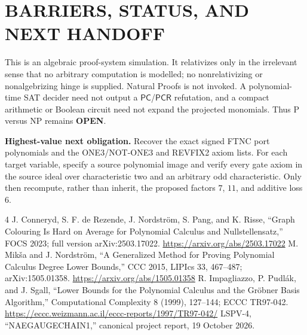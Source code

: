\documentclass[11pt]{article}
\newcommand{\PC}{\ensuremath{\mathsf{PC}}}
\newcommand{\PCR}{\ensuremath{\mathsf{PCR}}}
\newcommand{\OPEN}{\textbf{OPEN}}
\begin{document}
\section{BARRIERS, STATUS, AND NEXT HANDOFF}
This is an algebraic proof-system simulation.  It relativizes only in the
irrelevant sense that no arbitrary computation is modelled; no
nonrelativizing or nonalgebrizing hinge is supplied.  Natural Proofs is not
invoked.  A polynomial-time SAT decider need not output a \PC/\PCR{}
refutation, and a compact arithmetic or Boolean circuit need not expand the
projected monomials.  Thus P versus NP remains \OPEN.

\textbf{Highest-value next obligation.}  Recover the exact signed FTNC port
polynomials and the ONE3/NOT-ONE3 and REVFIX2 axiom lists.  For each target
variable, specify a source polynomial image and verify every gate axiom in the
source ideal over characteristic two and an arbitrary odd characteristic.
Only then recompute, rather than inherit, the proposed factors $7$, $11$, and
additive loss $6$.

\begin{thebibliography}{4}
 J. Conneryd, S. F. de Rezende, J. Nordstr\"om, S. Pang,
and K. Risse, ``Graph Colouring Is Hard on Average for Polynomial Calculus
and Nullstellensatz,'' FOCS 2023; full version arXiv:2503.17022.
\url{https://arxiv.org/abs/2503.17022}
 M. Mik\v{s}a and J. Nordstr\"om, ``A Generalized Method for
Proving Polynomial Calculus Degree Lower Bounds,'' CCC 2015, LIPIcs 33,
467--487; arXiv:1505.01358.
\url{https://arxiv.org/abs/1505.01358}
 R. Impagliazzo, P. Pudl\'ak, and J. Sgall, ``Lower Bounds for
the Polynomial Calculus and the Gr\"obner Basis Algorithm,'' Computational
Complexity 8 (1999), 127--144; ECCC TR97-042.
\url{https://eccc.weizmann.ac.il/eccc-reports/1997/TR97-042/}
 LSPV-4, ``NAEGAUGECHAIN1,'' canonical project report,
19 October 2026.
\end{thebibliography}
\end{document}

